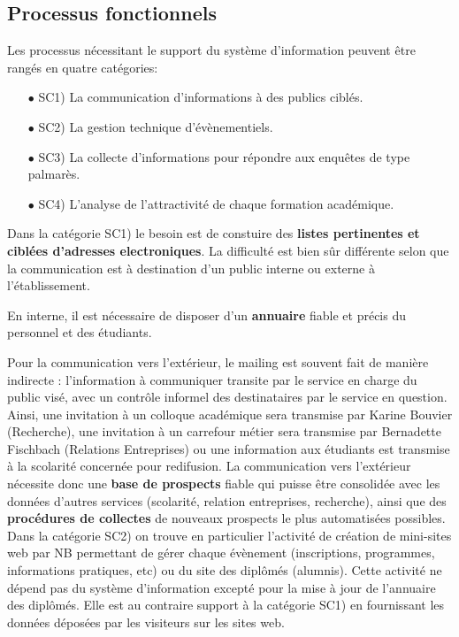 \documentclass{book}
\begin{document}
\subsection{Processus fonctionnels}
Les processus nécessitant le support du système d'information peuvent 
être rangés en quatre catégories:
\begin{itemize}
\item[$\bullet$] SC1) La communication d'informations à des publics ciblés.
\item[$\bullet$] SC2) La gestion technique d'évènementiels.
\item[$\bullet$] SC3) La collecte d'informations pour répondre aux enquêtes de type 
      palmarès.
\item[$\bullet$] SC4) L'analyse de l'attractivité de chaque formation académique.
\end{itemize}
\bigskip

Dans la catégorie SC1) le besoin est de constuire des \textbf{listes 
pertinentes et ciblées d'adresses electroniques}. La difficulté
est bien sûr différente selon que la communication est à destination
d'un public interne ou externe à l'établissement.

En interne, il est nécessaire de disposer d'un \textbf{annuaire}
fiable et précis du personnel et des étudiants. 

Pour la communication vers l'extérieur, le mailing est souvent 
fait de manière indirecte : l'information à communiquer transite par
le service en charge du public visé, avec un contrôle informel des 
destinataires par le service en question. Ainsi, une invitation à un 
colloque académique sera transmise par Karine Bouvier (Recherche),
une invitation à un carrefour métier sera transmise par Bernadette 
Fischbach (Relations Entreprises) ou une information aux étudiants
est transmise à la scolarité concernée pour redifusion. La communication 
vers l'extérieur nécessite donc une \textbf{base de prospects} fiable 
qui puisse être consolidée avec les données d'autres services (scolarité, 
relation entreprises, recherche), ainsi que des \textbf{procédures 
de collectes} de nouveaux prospects le plus automatisées possibles.\\

Dans la catégorie SC2) on trouve en particulier l'activité de création
de mini-sites web par NB permettant de gérer chaque évènement (inscriptions,
programmes, informations pratiques, etc) ou du site des diplômés (alumnis).
Cette activité ne dépend pas du système d'information excepté pour
la mise à jour de l'annuaire des diplômés. Elle est au contraire 
support à la catégorie SC1) en fournissant les données déposées par les
visiteurs sur les sites web.\\ 
\end{document}

